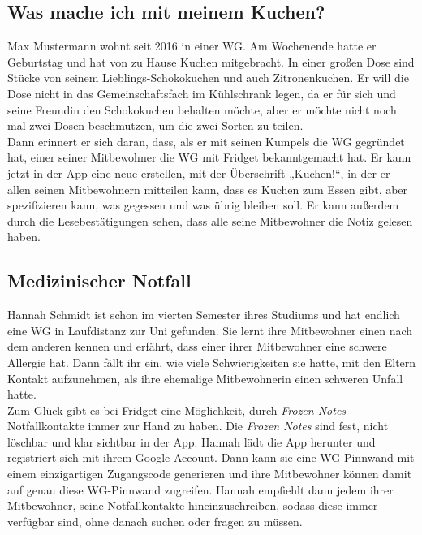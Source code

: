 \documentclass[a4paper]{scrreprt}
\begin{document}
        \subsection{Was mache ich mit meinem Kuchen?}
        Max Mustermann wohnt seit 2016 in einer WG. Am Wochenende hatte er Geburtstag und hat von zu Hause Kuchen mitgebracht. In einer großen Dose sind Stücke von seinem Lieblings-Schokokuchen und auch Zitronenkuchen. Er will die Dose nicht in das Gemeinschaftsfach im Kühlschrank legen, da er für sich und seine Freundin den Schokokuchen behalten möchte, aber er möchte nicht noch mal zwei Dosen beschmutzen, um die zwei Sorten zu teilen.\\
        Dann erinnert er sich daran, dass, als er mit seinen Kumpels die WG gegründet hat, einer seiner Mitbewohner die WG mit Fridget bekanntgemacht hat. Er kann jetzt in der App eine neue  erstellen, mit der Überschrift „Kuchen!“, in der er allen seinen Mitbewohnern mitteilen kann, dass es Kuchen zum Essen gibt, aber spezifizieren kann, was gegessen und was übrig bleiben soll. Er kann außerdem durch die Lesebestätigungen sehen, dass alle seine Mitbewohner die Notiz gelesen haben.
        \\
        
        \subsection{Medizinischer Notfall}
        Hannah Schmidt ist schon im vierten Semester ihres Studiums und hat endlich eine WG in Laufdistanz zur Uni gefunden. Sie lernt ihre Mitbewohner einen nach dem anderen kennen und erfährt, dass einer ihrer Mitbewohner eine schwere Allergie hat. Dann fällt ihr ein, wie viele Schwierigkeiten sie hatte, mit den Eltern Kontakt aufzunehmen, als ihre ehemalige Mitbewohnerin einen schweren Unfall hatte.\\
        Zum Glück gibt es bei Fridget eine Möglichkeit, durch \textit{Frozen Notes} Notfallkontakte immer zur Hand zu haben. Die \textit{Frozen Notes} sind fest, nicht löschbar und klar sichtbar in der App. Hannah lädt die App herunter und registriert sich mit ihrem Google Account. Dann kann sie eine WG-Pinnwand mit einem einzigartigen Zugangscode generieren und ihre Mitbewohner können damit auf genau diese WG-Pinnwand zugreifen. Hannah empfiehlt dann jedem ihrer Mitbewohner, seine Notfallkontakte hineinzuschreiben, sodass diese immer verfügbar sind, ohne danach suchen oder fragen zu müssen.
        \newpage
        
\end{document}
